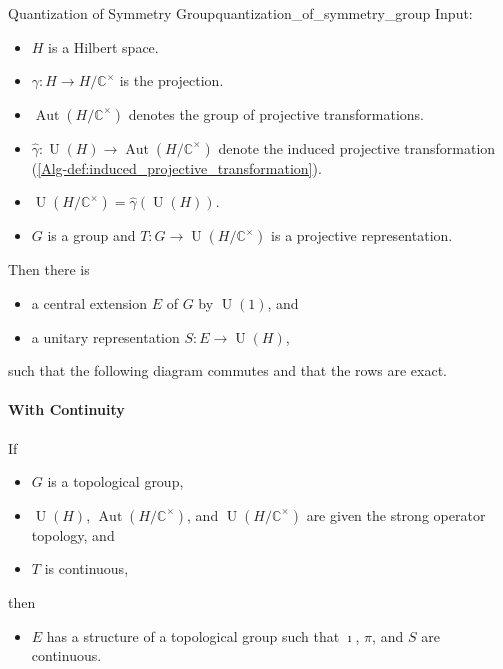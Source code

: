 \documentclass{article}
\begin{document}
\begin{theorem}{Quantization of Symmetry Group}{quantization_of_symmetry_group}
    Input:
    \begin{itemize}
        \item $H$ is a Hilbert space.
        \item $\gamma: H\rightarrow H/\mathbb{C}^\times$ is the projection.
        \item $\operatorname{Aut}(H/\mathbb{C}^\times)$ denotes the group of projective transformations.
        \item $\hat{\gamma}:\operatorname{U}(H) \rightarrow \operatorname{Aut}(H/\mathbb{C}^\times)$ denote the induced projective transformation (\cref{Alg-def:induced_projective_transformation}).
        \item $\operatorname{U}(H/\mathbb{C}^\times) = \hat{\gamma}(\operatorname{U}(H))$.
        \item $G$ is a group and $T:G\rightarrow \operatorname{U}(H/\mathbb{C}^\times)$ is a projective representation.
    \end{itemize}
    Then there is
    \begin{itemize}
        \item a central extension $E$ of $G$ by $\operatorname{U}(1)$, and
        \item a unitary representation $S:E\rightarrow\operatorname{U}(H)$,
    \end{itemize}
    such that the following diagram commutes and that the rows are exact.
    \begin{center}
    \end{center}
    \paragraph*{With Continuity}
    If
    \begin{itemize}
        \item $G$ is a topological group,
        \item $\operatorname{U}(H)$, $\operatorname{Aut}(H/\mathbb{C}^\times)$, and $\operatorname{U}(H/\mathbb{C}^\times)$ are given the strong operator topology, and
        \item $T$ is continuous,
    \end{itemize}
    then
    \begin{itemize}
        \item $E$ has a structure of a topological group such that $\imath$, $\pi$, and $S$ are continuous.
    \end{itemize}
\end{theorem}
\end{document}
